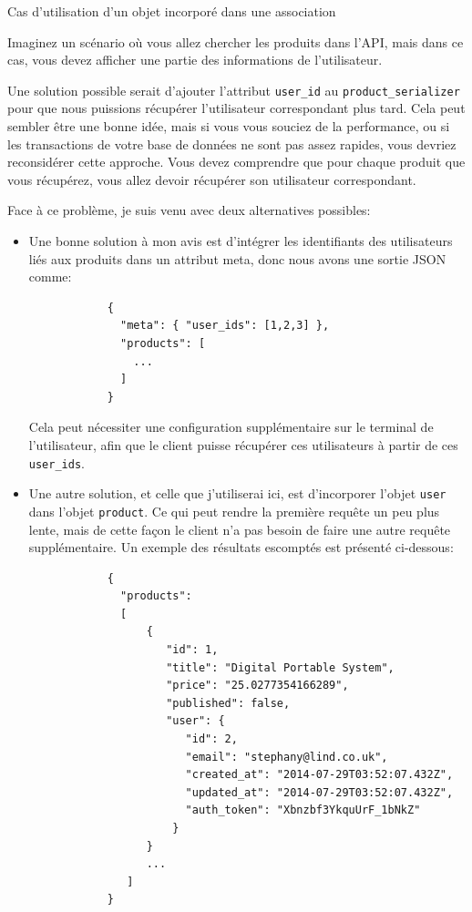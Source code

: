 \documentclass[]{report}
\begin{document}
    \begin{tcolorbox}{Cas d'utilisation d'un objet incorporé dans une association}\label{box:association_embeded}

      Imaginez un scénario où vous allez chercher les produits dans l'API, mais dans ce cas, vous devez afficher une partie des informations de l'utilisateur.

      Une solution possible serait d'ajouter l'attribut \verb|user_id| au \verb|product_serializer| pour que nous puissions récupérer l'utilisateur correspondant plus tard. Cela peut sembler être une bonne idée, mais si vous vous souciez de la performance, ou si les transactions de votre base de données ne sont pas assez rapides, vous devriez reconsidérer cette approche. Vous devez comprendre que pour chaque produit que vous récupérez, vous allez devoir récupérer son utilisateur correspondant.

      Face à ce problème, je suis venu avec deux alternatives possibles:

      \begin{itemize}
        \item Une bonne solution à mon avis est d'intégrer les identifiants des utilisateurs liés aux produits dans un attribut meta, donc nous avons une sortie JSON comme:
          \begin{scriptsize}
            \begin{lstlisting}
            {
              "meta": { "user_ids": [1,2,3] },
              "products": [
                ...
              ]
            }
            \end{lstlisting}
          \end{scriptsize}
          Cela peut nécessiter une configuration supplémentaire sur le terminal de l'utilisateur, afin que le client puisse récupérer ces utilisateurs à partir de ces \verb|user_ids|.
        \item Une autre solution, et celle que j'utiliserai ici, est d'incorporer l'objet \verb|user| dans l'objet \verb|product|. Ce qui peut rendre la première requête un peu plus lente, mais de cette façon le client n'a pas besoin de faire une autre requête supplémentaire. Un exemple des résultats escomptés est présenté ci-dessous:
          \begin{scriptsize}
            \begin{lstlisting}
            {
              "products":
              [
                  {
                     "id": 1,
                     "title": "Digital Portable System",
                     "price": "25.0277354166289",
                     "published": false,
                     "user": {
                        "id": 2,
                        "email": "stephany@lind.co.uk",
                        "created_at": "2014-07-29T03:52:07.432Z",
                        "updated_at": "2014-07-29T03:52:07.432Z",
                        "auth_token": "Xbnzbf3YkquUrF_1bNkZ"
                      }
                  }
                  ...
               ]
            }
            \end{lstlisting}
          \end{scriptsize}
      \end{itemize}


\end{tcolorbox}
\end{document}
